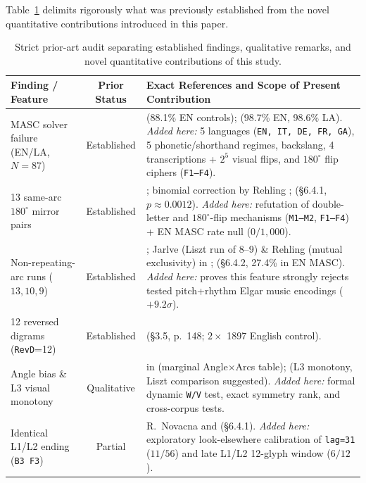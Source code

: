 \documentclass[10pt,a4paper,twocolumn]{article}
\newcommand{\code}[1]{\texttt{\small #1}}
\begin{document}
Table~\ref{tab:priorart} delimits rigorously what was previously established from the novel quantitative contributions introduced in this paper.

\begin{table}[t]
\centering
\caption{Strict prior-art audit separating established findings, qualitative remarks, and novel quantitative contributions of this study.}
\label{tab:priorart}
\footnotesize
\renewcommand{\arraystretch}{1.12}
\begin{tabularx}{\textwidth}{@{}p{4.3cm} c X@{}}
\toprule
\textbf{Finding / Feature} & \textbf{Prior Status} & \textbf{Exact References and Scope of Present Contribution} \\
\midrule
MASC solver failure (EN/LA, $N=87$) & Established & \citet{hauer2021dorabella} (88.1\% EN controls); \citet{wase2025dorabella} (98.7\% EN, 98.6\% LA). \emph{Added here:} 5 languages (\code{EN, IT, DE, FR, GA}), 5 phonetic/shorthand regimes, backslang, 4 transcriptions + $2^5$ visual flips, and $180^\circ$ flip ciphers (\code{F1--F4}). \\
13 same-arc $180^\circ$ mirror pairs & Established & \citet{massey2017dorabella}; binomial correction by Rehling \citep{pelling2019dorabella}; \citet{hauer2021dorabella} (\S6.4.1, $p\approx 0.0012$). \emph{Added here:} refutation of double-letter and $180^\circ$-flip mechanisms (\code{M1--M2}, \code{F1--F4}) + EN MASC rate null ($0/1{,}000$). \\
Non-repeating-arc runs ($13,10,9$) & Established & \citet{massey2017dorabella}; Jarlve (Liszt run of 8--9) \& Rehling (mutual exclusivity) in \citet{pelling2019dorabella}; \citet{hauer2021dorabella} (\S6.4.2, 27.4\% in EN MASC). \emph{Added here:} proves this feature strongly rejects tested pitch+rhythm Elgar music encodings ($+9.2\sigma$). \\
12 reversed digrams (\code{RevD}=12) & Established & \citet{schmeh2018dorabella} (\S3.5, p.~148; $2\times$ 1897 English control). \\
Angle bias \& L3 visual monotony & Qualitative & \citet{ernst2018cipherbrain} in \citet{schmeh2021faelschung} (marginal Angle$\times$Arcs table); \citet{pelling2019dorabella} (L3 monotony, Liszt comparison suggested). \emph{Added here:} formal dynamic \code{W/V} test, exact symmetry rank, and cross-corpus tests. \\
Identical L1/L2 ending (\code{B3 F3}) & Partial & R.~Novacna \citep{pelling2019dorabella} and \citet{hauer2021dorabella} (\S6.4.1). \emph{Added here:} exploratory look-elsewhere calibration of \code{lag=31} ($11/56$) and late L1/L2 12-glyph window ($6/12$). \\

\end{tabularx}
\end{table}
\end{document}
